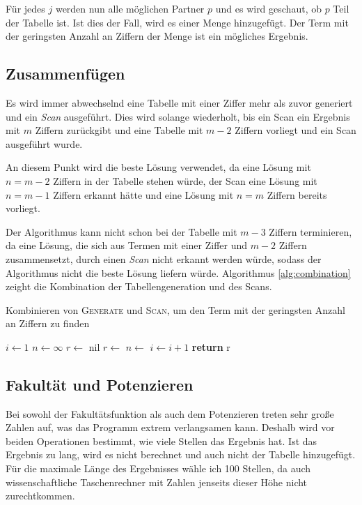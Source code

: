 \documentclass[a4paper,10pt,ngerman]{scrartcl}
\begin{document}
Für jedes $j$ werden nun alle möglichen Partner $p$ und es wird geschaut, ob $p$ Teil der Tabelle ist.
Ist dies der Fall, wird es einer Menge hinzugefügt.
Der Term mit der geringsten Anzahl an Ziffern der Menge ist ein mögliches Ergebnis.

\subsection{Zusammenfügen}
Es wird immer abwechselnd eine Tabelle mit einer Ziffer mehr als zuvor generiert und ein \textit{Scan} ausgeführt.
Dies wird solange wiederholt, bis ein Scan ein Ergebnis mit $m$ Ziffern zurückgibt und eine Tabelle mit $m-2$ Ziffern vorliegt und ein Scan ausgeführt wurde.

An diesem Punkt wird die beste Lösung verwendet, da eine Lösung mit $n=m-2$ Ziffern in der Tabelle stehen würde, der Scan eine Lösung mit $n=m-1$ Ziffern erkannt hätte und eine Lösung mit $n=m$ Ziffern bereits vorliegt.

Der Algorithmus kann nicht schon bei der Tabelle mit $m-3$ Ziffern terminieren, da eine Lösung, die sich aus Termen mit einer Ziffer und $m-2$ Ziffern zusammensetzt, durch einen \textit{Scan} nicht erkannt werden würde, sodass der Algorithmus nicht die beste Lösung liefern würde.
Algorithmus \ref{alg:combination} zeight die Kombination der Tabellengeneration und des Scans.


\begin{algorithm}
  \caption{Kombinieren von \textsc{Generate} und \textsc{Scan}, um den Term mit der geringsten Anzahl an Ziffern zu finden}
  \begin{algorithmic}[1]
    \State $i \gets 1$
    \State $n \gets \infty$
    \State $r \gets$ nil
        \State {}
        \State $r \gets$ 
          \State $n \gets$ 
        \EndIf
        \State $i \gets i+1$
    \EndWhile
    \State \textbf{return} r
  \end{algorithmic}
  \label{alg:combination}
\end{algorithm}

\subsection{Fakultät und Potenzieren}
Bei sowohl der Fakultätsfunktion als auch dem Potenzieren treten sehr große Zahlen auf, was das Programm extrem verlangsamen kann.
Deshalb wird vor beiden Operationen bestimmt, wie viele Stellen das Ergebnis hat.
Ist das Ergebnis zu lang, wird es nicht berechnet und auch nicht der Tabelle hinzugefügt.
Für die maximale Länge des Ergebnisses wähle ich 100 Stellen, da auch wissenschaftliche Taschenrechner mit Zahlen jenseits dieser Höhe nicht zurechtkommen.
\end{document}
